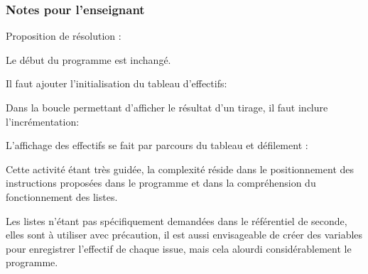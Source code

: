 \newpage

\subsubsection{Notes pour l'enseignant}

%
%
\begin{methode}
Proposition de résolution :

Le début du programme est inchangé.


Il faut ajouter l'initialisation du tableau d'effectifs:

Dans la boucle permettant d'afficher le résultat d'un tirage, il faut inclure l'incrémentation:


L'affichage des effectifs se fait par parcours du tableau et défilement :

\end{methode}


\begin{remarque}
   Cette activité étant très guidée, la complexité réside dans le positionnement des instructions proposées dans le programme et dans la compréhension du fonctionnement des listes.
   
   Les listes n'étant pas spécifiquement demandées dans le référentiel de seconde, elles sont à utiliser avec précaution, il est aussi envisageable de créer des variables pour enregistrer l'effectif de chaque issue, mais cela alourdi considérablement le programme.
\end{remarque}
